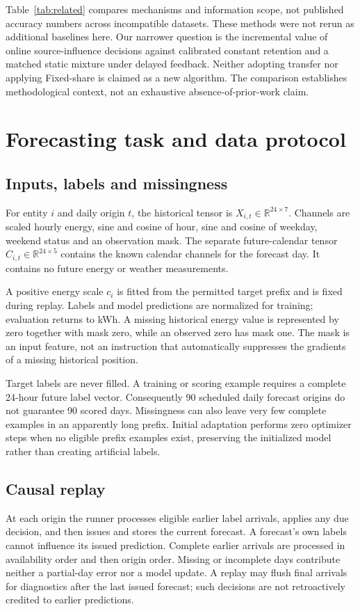 \documentclass[pdflatex,iicol,sn-mathphys-num]{sn-jnl}
\begin{document}
Table~\ref{tab:related} compares mechanisms and information scope, not published accuracy numbers across incompatible datasets. These methods were not rerun as additional baselines here. Our narrower question is the incremental value of online source-influence decisions against calibrated constant retention and a matched static mixture under delayed feedback. Neither adopting transfer nor applying Fixed-share is claimed as a new algorithm. The comparison establishes methodological context, not an exhaustive absence-of-prior-work claim.

\section{Forecasting task and data protocol}
\subsection{Inputs, labels and missingness}
For entity $i$ and daily origin $t$, the historical tensor is $X_{i,t}\in\mathbb R^{24\times7}$. Channels are scaled hourly energy, sine and cosine of hour, sine and cosine of weekday, weekend status and an observation mask. The separate future-calendar tensor $C_{i,t}\in\mathbb R^{24\times5}$ contains the known calendar channels for the forecast day. It contains no future energy or weather measurements.

A positive energy scale $c_i$ is fitted from the permitted target prefix and is fixed during replay. Labels and model predictions are normalized for training; evaluation returns to kWh. A missing historical energy value is represented by zero together with mask zero, while an observed zero has mask one. The mask is an input feature, not an instruction that automatically suppresses the gradients of a missing historical position.

Target labels are never filled. A training or scoring example requires a complete 24-hour future label vector. Consequently 90 scheduled daily forecast origins do not guarantee 90 scored days. Missingness can also leave very few complete examples in an apparently long prefix. Initial adaptation performs zero optimizer steps when no eligible prefix examples exist, preserving the initialized model rather than creating artificial labels.

\subsection{Causal replay}
At each origin the runner processes eligible earlier label arrivals, applies any due decision, and then issues and stores the current forecast. A forecast's own labels cannot influence its issued prediction. Complete earlier arrivals are processed in availability order and then origin order. Missing or incomplete days contribute neither a partial-day error nor a model update. A replay may flush final arrivals for diagnostics after the last issued forecast; such decisions are not retroactively credited to earlier predictions.
\end{document}
